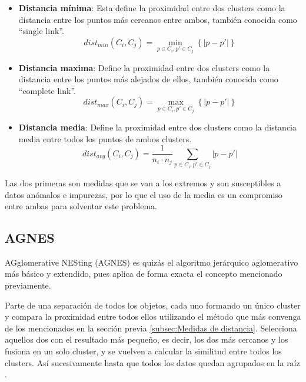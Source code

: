 \documentclass[10pt, a4paper]{article}
\begin{document}
\begin{itemize}
  \item \textbf{Distancia mínima}: Esta define la proximidad entre dos clusters como la distancia entre los puntos más cercanos entre ambos, también conocida como ``single link''.
\begin{equation} dist_{min}(C_i, C_j) =  \min_{p \in C_i, p' \in C_j} \left\{|p - p'|\right\} \end{equation}

  \item \textbf{Distancia maxima}: Define la proximidad entre dos clusters como la distancia entre los puntos más alejados de ellos, también conocida como ``complete link''.
\begin{equation} dist_{max}(C_i, C_j) =  \max_{p \in C_i, p' \in C_j} \left\{|p - p'|\right\} \end{equation}

  \item \textbf{Distancia media}: Define la proximidad entre dos clusters como la distancia media entre todos los puntos de ambos clusters.
\begin{equation} dist_{avg}(C_i, C_j) = \frac{1}{n_i \cdot n_j} \sum_{p \in C_i, p' \in C_j} |p - p'|  \end{equation}
\end{itemize}

Las dos primeras son medidas que se van a los extremos y son susceptibles a datos anómalos e impurezas, por lo que el uso de la media es un compromiso entre ambas para solventar este problema.




\subsection{\textbf{AGNES}} \label{subsec:AGNES} 

\cite{jerarquico} AGglomerative NESting (AGNES) es quizás el algoritmo jerárquico aglomerativo más básico y extendido, pues aplica de forma exacta el concepto mencionado previamente. 

Parte de una separación de todos los objetos, cada uno formando un único cluster y compara la proximidad entre todos ellos utilizando el método que más convenga de los mencionados en la sección previa \ref{subsec:Medidas de distancia}. Selecciona aquellos dos con el resultado más pequeño, es decir, los dos más cercanos y los fusiona en un solo cluster, y se vuelven a calcular la similitud entre todos los clusters. Así sucesivamente hasta que todos los datos quedan agrupados en la raíz \cite{18}.
\end{document}
